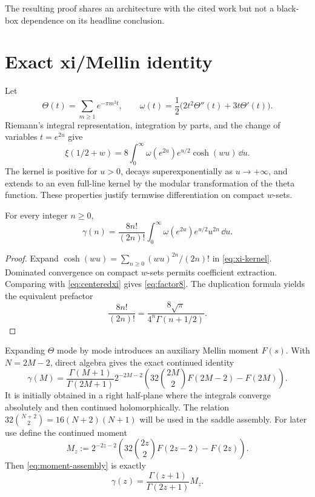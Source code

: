 \documentclass[12pt]{article}
\begin{document}
The resulting proof shares an architecture with the cited work but not a
black-box dependence on its headline conclusion.

\section{Exact xi/Mellin identity}\label{sec:mellin}

Let
\[
 \Theta(t)=\sum_{m\ge1}e^{-\pi m^2t},\qquad
 \omega(t)=\frac12\bigl(2t^2\Theta''(t)+3t\Theta'(t)\bigr).
\]
Riemann's integral representation, integration by parts, and the change of
variables $t=e^{2u}$ give
\begin{equation}\label{eq:xi-kernel}
 \xi(1/2+w)=8\int_0^\infty
  \omega(e^{2u})e^{u/2}\cosh(wu)\,\dd u.
\end{equation}
The kernel is positive for $u>0$, decays superexponentially as
$u\to+\infty$, and extends to an even full-line kernel by the modular
transformation of the theta function.  These properties justify termwise
differentiation on compact $w$-sets.

\begin{proposition}\label{prop:factor8}
For every integer $n\ge0$,
\begin{equation}\label{eq:factor8}
 \gamma(n)=\frac{8n!}{(2n)!}
 \int_0^\infty\omega(e^{2u})e^{u/2}u^{2n}\,\dd u.
\end{equation}
\end{proposition}

\begin{proof}
Expand $\cosh(wu)=\sum_{n\ge0}(wu)^{2n}/(2n)!$ in
\eqref{eq:xi-kernel}.  Dominated convergence on compact $w$-sets permits
coefficient extraction.  Comparing with \eqref{eq:centeredxi} gives
\eqref{eq:factor8}.  The duplication formula yields the equivalent prefactor
\[
 \frac{8n!}{(2n)!}=\frac{8\sqrt\pi}{4^n\Gamma(n+1/2)}.
\]
\end{proof}

Expanding $\Theta$ mode by mode introduces an auxiliary Mellin moment $F(s)$.
With $N=2M-2$, direct algebra gives the exact continued identity
\begin{equation}\label{eq:moment-assembly}
 \gamma(M)=\frac{\Gamma(M+1)}{\Gamma(2M+1)}2^{-2M-2}
 \left(32\binom{2M}{2}F(2M-2)-F(2M)\right).
\end{equation}
It is initially obtained in a right half-plane where the integrals converge
absolutely and then continued holomorphically.  The relation
$32\binom{N+2}{2}=16(N+2)(N+1)$ will be used in the saddle assembly.
For later use define the continued moment
\begin{equation}\label{eq:Mz-definition}
 M_z:=2^{-2z-2}\left(32\binom{2z}{2}F(2z-2)-F(2z)\right).
\end{equation}
Then \eqref{eq:moment-assembly} is exactly
\begin{equation}\label{eq:gamma-M}
 \gamma(z)=\frac{\Gamma(z+1)}{\Gamma(2z+1)}M_z.
\end{equation}
\end{document}
